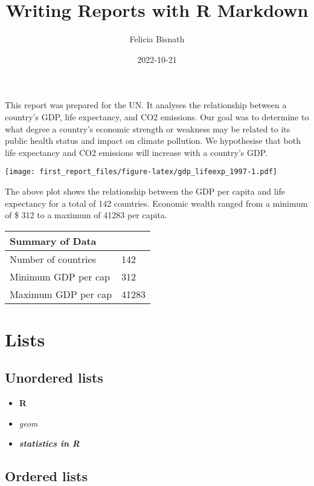 \documentclass[
]{article}
\title{Writing Reports with R Markdown}
\author{Felicia Bisnath}
\date{2022-10-21}
\providecommand{\tightlist}{%
  \setlength{\itemsep}{0pt}\setlength{\parskip}{0pt}}
\begin{document}
\maketitle

This report was prepared for the UN. It analyses the relationship
between a country's GDP, life expectancy, and CO2 emissions. Our goal
was to determine to what degree a country's economic strength or
weakness may be related to its public health status and impact on
climate pollution. We hypothesise that both life expectancy and CO2
emissions will increase with a country's GDP.

\texttt{[image: first\_report\_files/figure-latex/gdp\_lifeexp\_1997-1.pdf]}

The above plot shows the relationship between the GDP per capita and
life expectancy for a total of 142 countries. Economic wealth ranged
from a minimum of \$ 312 to a maximum of 41283 per capita.

\begin{longtable}[]{@{}ll@{}}
\toprule()
Summary of Data & \\
\midrule()
\endhead
Number of countries & 142 \\
Minimum GDP per cap & 312 \\
Maximum GDP per cap & 41283 \\
\bottomrule()
\end{longtable}

\hypertarget{lists}{%
\section{Lists}\label{lists}}

\hypertarget{unordered-lists}{%
\subsection{Unordered lists}\label{unordered-lists}}

\begin{itemize}
\tightlist
\item
  \textbf{R}
\item
  \emph{geom}
\item
  \textbf{\emph{statistics in R}}
\end{itemize}

\hypertarget{ordered-lists}{%
\subsection{Ordered lists}\label{ordered-lists}}
\end{document}

